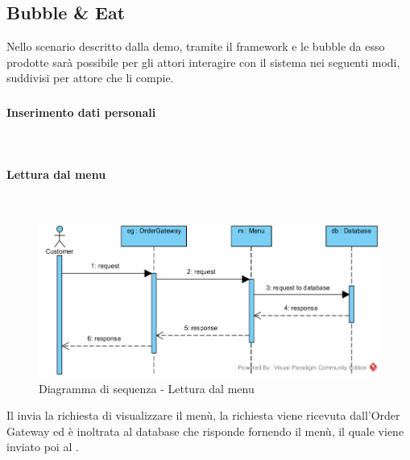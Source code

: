 \subsection{Bubble \& Eat}
Nello scenario descritto dalla demo, tramite il framework e le bubble da esso prodotte sarà possibile per gli attori interagire con il sistema nei seguenti modi, suddivisi per attore che li compie.

\subsubsection{\Customer{}}
\begin{samepage}
\paragraph{Inserimento dati personali}\mbox{}\\
\end{samepage}

\begin{samepage}
\paragraph{Lettura dal menu}\mbox{}\\
\end{samepage}
\begin{figure}[H]
	\centering
	\includegraphics[width=15cm]{../../documenti/SpecificaTecnica/diagrammi_img/sequenza/client_visualizza_menu.png}
	\caption{Diagramma di sequenza - Lettura dal menu}
\end{figure}
Il \Customer{} invia la richiesta di visualizzare il menù, la richiesta viene ricevuta dall'Order Gateway ed è inoltrata al database che risponde fornendo il menù, il quale viene inviato poi al \Customer{}.

